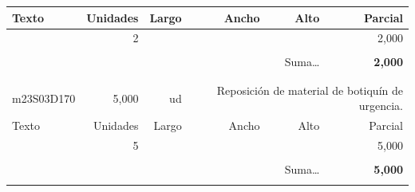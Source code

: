 \documentclass{book}%
\begin{document}
\begin{longtable}{lrrrrr}
Texto&Unidades&Largo&Ancho&Alto&Parcial\\%
\hline%
\multicolumn{1}{p{3.5cm}}{ }&2&&&&     2,000\\%
&&&&&\\%
\multicolumn{5}{r}{Suma\ldots}&\textbf{     2,000}\\%
\hline%
&&&&&\\%
&&&&&\\%
m23S03D170&     5,000& ud&\multicolumn{3}{p{6cm}}{\scriptsize Reposición de material de botiquín de urgencia.\normalsize}\\%
Texto&Unidades&Largo&Ancho&Alto&Parcial\\%
\hline%
\multicolumn{1}{p{3.5cm}}{ }&5&&&&     5,000\\%
&&&&&\\%
\multicolumn{5}{r}{Suma\ldots}&\textbf{     5,000}\\%
\hline%
&&&&&\\%
\end{longtable}%
\newpage

%
\end{document}

